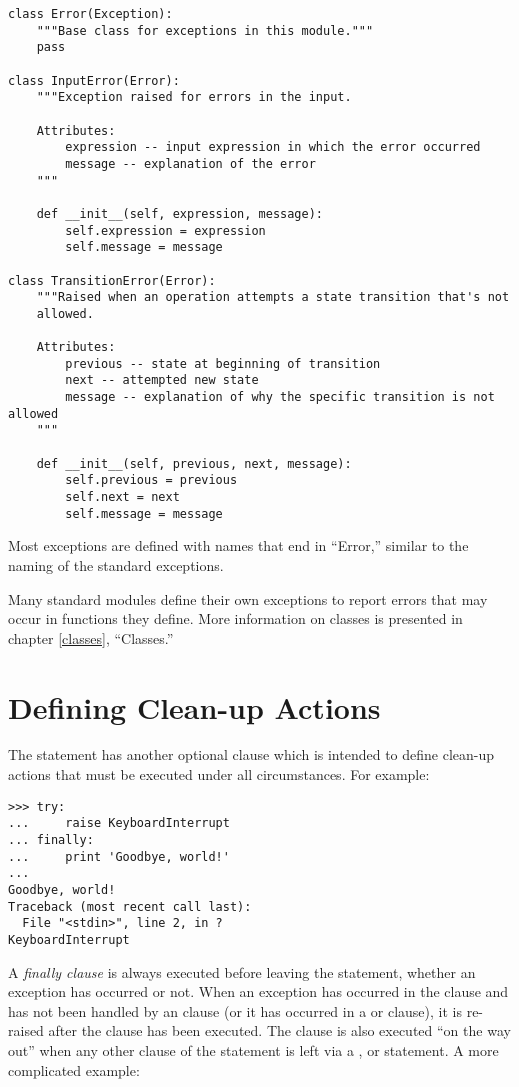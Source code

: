 \documentclass{manual}
\begin{document}
\begin{verbatim}
class Error(Exception):
    """Base class for exceptions in this module."""
    pass

class InputError(Error):
    """Exception raised for errors in the input.

    Attributes:
        expression -- input expression in which the error occurred
        message -- explanation of the error
    """

    def __init__(self, expression, message):
        self.expression = expression
        self.message = message

class TransitionError(Error):
    """Raised when an operation attempts a state transition that's not
    allowed.

    Attributes:
        previous -- state at beginning of transition
        next -- attempted new state
        message -- explanation of why the specific transition is not allowed
    """

    def __init__(self, previous, next, message):
        self.previous = previous
        self.next = next
        self.message = message
\end{verbatim}

Most exceptions are defined with names that end in ``Error,'' similar
to the naming of the standard exceptions.

Many standard modules define their own exceptions to report errors
that may occur in functions they define.  More information on classes
is presented in chapter \ref{classes}, ``Classes.''


\section{Defining Clean-up Actions \label{cleanup}}

The  statement has another optional clause which is
intended to define clean-up actions that must be executed under all
circumstances.  For example:

\begin{verbatim}
>>> try:
...     raise KeyboardInterrupt
... finally:
...     print 'Goodbye, world!'
... 
Goodbye, world!
Traceback (most recent call last):
  File "<stdin>", line 2, in ?
KeyboardInterrupt
\end{verbatim}

A \emph{finally clause} is always executed before leaving the
 statement, whether an exception has occurred or not.
When an exception has occurred in the  clause and has not
been handled by an  clause (or it has occurred in a
 or  clause), it is re-raised after the
 clause has been executed.  The  clause
is also executed ``on the way out'' when any other clause of the
 statement is left via a , 
or  statement.  A more complicated example:
\end{document}

